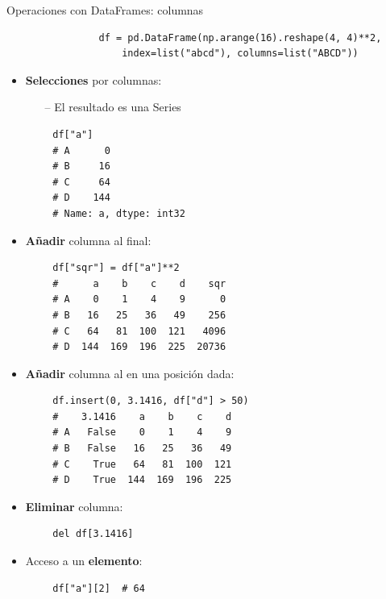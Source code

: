 \documentclass[10pt]{beamer} %
\begin{document}
\begin{frame}[fragile]{Operaciones con DataFrames: columnas}
    \begin{verbatim}
                df = pd.DataFrame(np.arange(16).reshape(4, 4)**2,
                    index=list("abcd"), columns=list("ABCD"))
    \end{verbatim}
    \begin{multicols}{2}
        \begin{itemize}
            \item \textbf{Selecciones} por columnas:
            \begin{itemize}
                \item[--] El resultado es una Series
            \end{itemize}
        \end{itemize}
        \begin{verbatim}
        df["a"]
        # A      0
        # B     16
        # C     64
        # D    144
        # Name: a, dtype: int32
        \end{verbatim}
        \begin{itemize}
            \item \textbf{Añadir} columna al final:
        \end{itemize}
        \begin{verbatim}
        df["sqr"] = df["a"]**2
        #      a    b    c    d    sqr
        # A    0    1    4    9      0
        # B   16   25   36   49    256
        # C   64   81  100  121   4096
        # D  144  169  196  225  20736
        \end{verbatim}
    \columnbreak
        \begin{itemize}
            \item \textbf{Añadir} columna al en una posición dada:
        \end{itemize}
        \begin{verbatim}
        df.insert(0, 3.1416, df["d"] > 50)
        #    3.1416    a    b    c    d
        # A   False    0    1    4    9
        # B   False   16   25   36   49
        # C    True   64   81  100  121
        # D    True  144  169  196  225
        \end{verbatim}
        \begin{itemize}
            \item \textbf{Eliminar} columna:
        \end{itemize}
        \begin{verbatim}
        del df[3.1416]
        \end{verbatim}
        \begin{itemize}
            \item Acceso a un \textbf{elemento}:
        \end{itemize}
        \begin{verbatim}
        df["a"][2]  # 64
        \end{verbatim}
    \end{multicols}
\end{frame}
\end{document}
